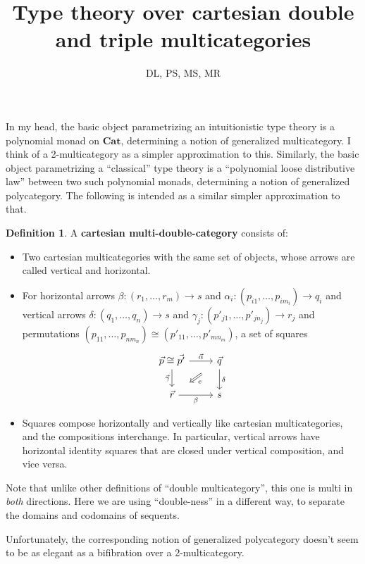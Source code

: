 \documentclass{article}
\title{Type theory over cartesian double and triple multicategories}
\author{DL, PS, MS, MR}
\theoremstyle{definition}
\newtheorem{defn}{Definition}
\begin{document}
\maketitle

In my head, the basic object parametrizing an intuitionistic type theory is a polynomial monad on $\mathbf{Cat}$, determining a notion of generalized multicategory.
I think of a 2-multicategory as a simpler approximation to this.
Similarly, the basic object parametrizing a ``classical'' type theory is a ``polynomial loose distributive law'' between two such polynomial monads, determining a notion of generalized polycategory.
The following is intended as a similar simpler approximation to that.

\begin{defn}
  A \textbf{cartesian multi-double-category} consists of:
  \begin{itemize}
  \item Two cartesian multicategories with the same set of objects, whose arrows are called vertical and horizontal.
  \item For horizontal arrows $\beta:(r_1,\dots,r_m)\to s$ and $\alpha_i:(p_{i1},\dots,p_{im_i})\to q_i$ and vertical arrows $\delta:(q_1,\dots,q_n) \to s$ and $\gamma_j:(p'_{j1},\dots,p'_{j n_j})\to r_j$ and permutations $(p_{11},\dots,p_{nm_n})\cong (p'_{11},\dots,p'_{mn_m})$, a set of squares
    \[\begin{tikzcd}
      \vec{p}\cong\vec{p'} \ar[r,"\vec{\alpha}"] \ar[d,swap,"\vec{\gamma}"]
      \ar[from=r,to=d,phantom,""{name=1,near start},""{name=2,near end}]
      \ar[Rightarrow,from=1,to=2,"e"]
      & \vec{q} \ar[d,"\delta"]
      \\ \vec{r} \ar[r,swap,"\beta"] & s
    \end{tikzcd}\]
  \item Squares compose horizontally and vertically like cartesian multicategories, and the compositions interchange.
    In particular, vertical arrows have horizontal identity squares that are closed under vertical composition, and vice versa.
  \end{itemize}
\end{defn}

Note that unlike other definitions of ``double multicategory'', this one is multi in \emph{both} directions.
Here we are using ``double-ness'' in a different way, to separate the domains and codomains of sequents.

Unfortunately, the corresponding notion of generalized polycategory doesn't seem to be as elegant as a bifibration over a 2-multicategory.
\end{document}
